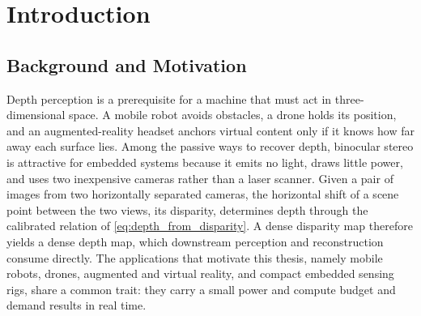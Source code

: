 \chapter{Introduction}

\section{Background and Motivation}
Depth perception is a prerequisite for a machine that must act in
three-dimensional space. A mobile robot avoids obstacles, a drone holds
its position, and an augmented-reality headset anchors virtual content
only if it knows how far away each surface lies. Among the passive ways to
recover depth, binocular stereo is attractive for embedded systems because
it emits no light, draws little power, and uses two inexpensive cameras
rather than a laser scanner. Given a pair of images from two horizontally
separated cameras, the horizontal shift of a scene point between the two
views, its disparity, determines depth through the calibrated relation of
\eqref{eq:depth_from_disparity}. A dense disparity map therefore yields a
dense depth map, which downstream perception and reconstruction consume
directly. The applications that motivate this thesis, namely mobile
robots, drones, augmented and virtual reality, and compact embedded
sensing rigs, share a common trait: they carry a small power and compute
budget and demand results in real time.

